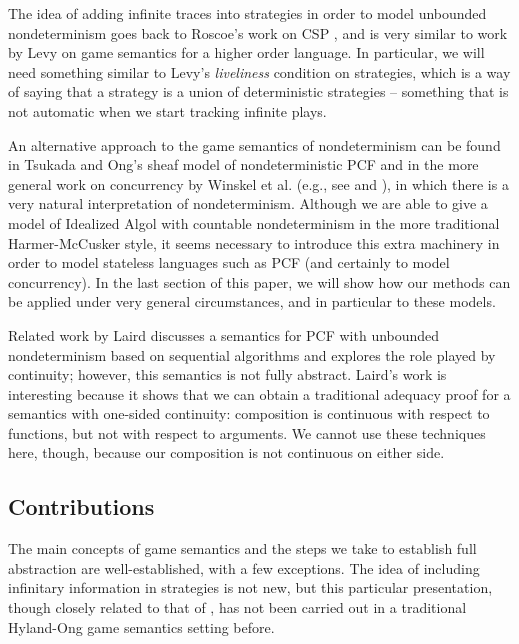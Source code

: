 \documentclass[sigplan,10pt,review]{acmart}\settopmatter{printfolios=true,printccs=false,printacmref=false}
\begin{document}
The idea of adding infinite traces into strategies in order to model unbounded nondeterminism goes back to Roscoe's work on CSP \cite{RoscoeCspInfinite}, and is very similar to work by Levy \cite{LevyGsInfinite} on game semantics for a higher order language.  
In particular, we will need something similar to Levy's \emph{liveliness} condition on strategies, which is a way of saying that a strategy is a union of deterministic strategies -- something that is not automatic when we start tracking infinite plays.  

An alternative approach to the game semantics of nondeterminism can be found in Tsukada and Ong's sheaf model of nondeterministic PCF \cite{TsukadaSheaves} and in the more general work on concurrency by Winskel et al. (e.g., see \cite{StrategiesAsProfunctors} and \cite{ConcurrentHylandOngGames}), in which there is a very natural interpretation of nondeterminism.  
Although we are able to give a model of Idealized Algol with countable nondeterminism in the more traditional Harmer-McCusker style, it seems necessary to introduce this extra machinery in order to model stateless languages such as PCF (and certainly to model concurrency).  
In the last section of this paper, we will show how our methods can be applied under very general circumstances, and in particular to these models.

Related work by Laird \cite{LairdOrdinalGames,FunctionalProgramsAsCoroutines} discusses a semantics for PCF with unbounded nondeterminism based on sequential algorithms and explores the role played by continuity; however, this semantics is not fully abstract.  
Laird's work is interesting because it shows that we can obtain a traditional adequacy proof for a semantics with one-sided continuity: composition is continuous with respect to functions, but not with respect to arguments.  
We cannot use these techniques here, though, because our composition is not continuous on either side.

\subsection{Contributions}

The main concepts of game semantics and the steps we take to establish full abstraction are well-established, with a few exceptions.  
The idea of including infinitary information in strategies is not new, but this particular presentation, though closely related to that of \cite{LevyGsInfinite}, has not been carried out in a traditional Hyland-Ong game semantics setting before.
\end{document}
